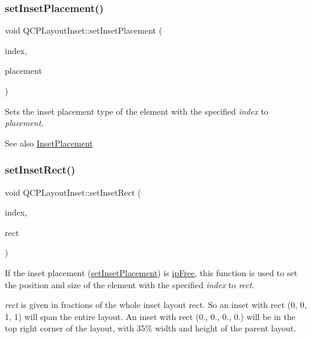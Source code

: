 \subsubsection{\texorpdfstring{set\+Inset\+Placement()}{setInsetPlacement()}}
{\footnotesize\ttfamily void Q\+C\+P\+Layout\+Inset\+::set\+Inset\+Placement (\begin{DoxyParamCaption}\item[{int}]{index,  }\item[{\hyperlink{class_q_c_p_layout_inset_a8b9e17d9a2768293d2a7d72f5e298192}{Q\+C\+P\+Layout\+Inset\+::\+Inset\+Placement}}]{placement }\end{DoxyParamCaption})}

Sets the inset placement type of the element with the specified {\itshape index} to {\itshape placement}.

\begin{DoxySeeAlso}{See also}
\hyperlink{class_q_c_p_layout_inset_a8b9e17d9a2768293d2a7d72f5e298192}{Inset\+Placement} 
\end{DoxySeeAlso}
\mbox{\label{class_q_c_p_layout_inset_aa487c8378a6f9533567a2e6430099dc3}} 
\subsubsection{\texorpdfstring{set\+Inset\+Rect()}{setInsetRect()}}
{\footnotesize\ttfamily void Q\+C\+P\+Layout\+Inset\+::set\+Inset\+Rect (\begin{DoxyParamCaption}\item[{int}]{index,  }\item[{const Q\+RectF \&}]{rect }\end{DoxyParamCaption})}

If the inset placement (\hyperlink{class_q_c_p_layout_inset_a63298830744d5d8c5345511c00fd2144}{set\+Inset\+Placement}) is \hyperlink{class_q_c_p_layout_inset_a8b9e17d9a2768293d2a7d72f5e298192aa4802986ea2cea457f932b115acba59e}{ip\+Free}, this function is used to set the position and size of the element with the specified {\itshape index} to {\itshape rect}.

{\itshape rect} is given in fractions of the whole inset layout rect. So an inset with rect (0, 0, 1, 1) will span the entire layout. An inset with rect (0., 0., 0., 0.) will be in the top right corner of the layout, with 35\% width and height of the parent layout.

